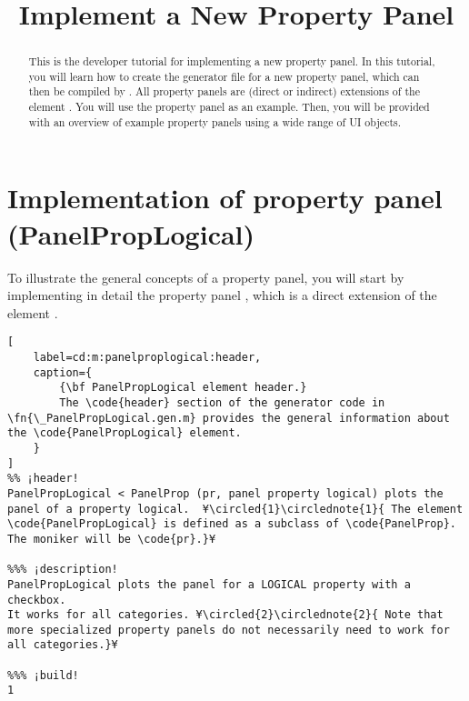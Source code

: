 \documentclass{tufte-handout}
\title{Implement a New Property Panel}
\begin{document}
\maketitle

\begin{abstract}
\noindent
This is the developer tutorial for implementing a new property panel. 
In this tutorial, you will learn how to create the generator file  for a new property panel, which can then be compiled by . 
All property panels are (direct or indirect) extensions of the element .
You will use the property panel  as an example.
Then, you will be provided with an overview of example property panels using a wide range of UI objects.
\end{abstract}

\tableofcontents

\clearpage

\section{Implementation of property panel (PanelPropLogical)}

To illustrate the general concepts of a property panel, you will start by implementing in detail the property panel , which is a direct extension of the element .

\begin{lstlisting}[
	label=cd:m:panelproplogical:header,
	caption={
		{\bf PanelPropLogical element header.}
		The \code{header} section of the generator code in \fn{\_PanelPropLogical.gen.m} provides the general information about the \code{PanelPropLogical} element.
	}
]
%% ¡header!
PanelPropLogical < PanelProp (pr, panel property logical) plots the panel of a property logical.  ¥\circled{1}\circlednote{1}{ The element \code{PanelPropLogical} is defined as a subclass of \code{PanelProp}. The moniker will be \code{pr}.}¥

%%% ¡description!
PanelPropLogical plots the panel for a LOGICAL property with a checkbox.
It works for all categories. ¥\circled{2}\circlednote{2}{ Note that more specialized property panels do not necessarily need to work for all categories.}¥

%%% ¡build!
1
\end{lstlisting}
\end{document}
